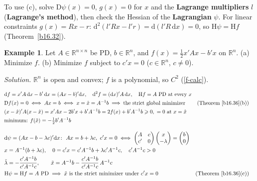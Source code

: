 \documentclass[12pt]{article}
\newcommand{\R}{\mathbb R}
\DeclareMathOperator{\rank}{rank}
\theoremstyle{definition}
\newtheorem{example}[theorem]{Example}
\newcommand{\lec}[1]{Lecture~#1}
\newcommand{\boardtop}{\vspace*{-\abovedisplayskip}}
\begin{document}
To use (c), solve \(\mathrm D\psi(x)=0\), \(g(x)=0\) for \(x\) and the \textbf{Lagrange multipliers} \(l\)
(\textbf{Lagrange's method}), then check the Hessian of the \textbf{Lagrangian} \(\psi\). For linear constraints
\(g(x)=Rx-r\): \(\mathrm{d}^2(l'Rx-l'r)=\mathrm{d}(l'R\,\mathrm{d}x)=0\), so \(\mathrm H\psi=\mathrm Hf\)
(Theorem~\ref{b16.32}).

\begin{example}\label{b16.37}
Let \(A\in\R^{n\times n}\) be PD, \(b\in\R^n\), and \(f(x)=\frac12x'Ax-b'x\) on \(\R^n\). (a) Minimize \(f\).
(b) Minimize \(f\) subject to \(c'x=0\) (\(c\in\R^n\), \(c\ne0\)).
\end{example}
\textit{Solution.} \(\R^n\) is open and convex; \(f\) is a polynomial, so \(C^2\) (\ref{f-calc}).
\begin{board}[(a) Theorem~\ref{b16.24}(a),(c) with \(A'=A\); Theorem~\ref{b16.32}; \(A\) is invertible (\lec{8},
Theorem~14(c)), \(A^{-1}\) symmetric (\lec{2}, Corollary~12):]
\boardtop
\begin{align*}
&\mathrm{d}f=x'A\,\mathrm{d}x-b'\,\mathrm{d}x=(Ax-b)'\mathrm{d}x,\quad\mathrm{d}^2f=(\mathrm{d}x)'A\,\mathrm{d}x,\quad
\mathrm Hf=A\text{ PD at every }x\\
&\mathrm Df(x)=0\iff Ax=b\iff x=\hat x=A^{-1}b\implies\text{the strict global minimizer}
&&\text{(Theorem~\ref{b16.36}(b))}\\
&(x-\hat x)'A(x-\hat x)=x'Ax-2b'x+b'A^{-1}b=2f(x)+b'A^{-1}b\geqslant0,\ =0\text{ at }x=\hat x\\
&\text{minimum: }f(\hat x)=-\tfrac12b'A^{-1}b
\end{align*}
\end{board}
\begin{board}[(b) \(\psi(x)=f(x)-\lambda c'x\); \lec{5}, Theorem~2(c); \(A^{-1}=(A^{-1})'AA^{-1}\) is PD (\lec{8},
Theorem~15(a), \(K=A^{-1}\), \(\rank A^{-1}=n\) by \lec{5}, Theorem~12(a)):]
\boardtop
\begin{align*}
&\mathrm{d}\psi=(Ax-b-\lambda c)'\mathrm{d}x\colon\ Ax=b+\lambda c,\ c'x=0\iff
\begin{pmatrix}A&c\\c'&0\end{pmatrix}\begin{pmatrix}x\\-\lambda\end{pmatrix}=\begin{pmatrix}b\\0\end{pmatrix}\\
&x=A^{-1}(b+\lambda c),\quad0=c'x=c'A^{-1}b+\lambda c'A^{-1}c,\quad c'A^{-1}c>0\\
&\tilde\lambda=-\frac{c'A^{-1}b}{c'A^{-1}c},\qquad\tilde x=A^{-1}b-\frac{c'A^{-1}b}{c'A^{-1}c}\,A^{-1}c\\
&\mathrm H\psi=\mathrm Hf=A\text{ PD}\implies\tilde x\text{ is the strict minimizer under }c'x=0
&&\text{(Theorem~\ref{b16.36}(c))}
\end{align*}
\end{board}
\end{document}
